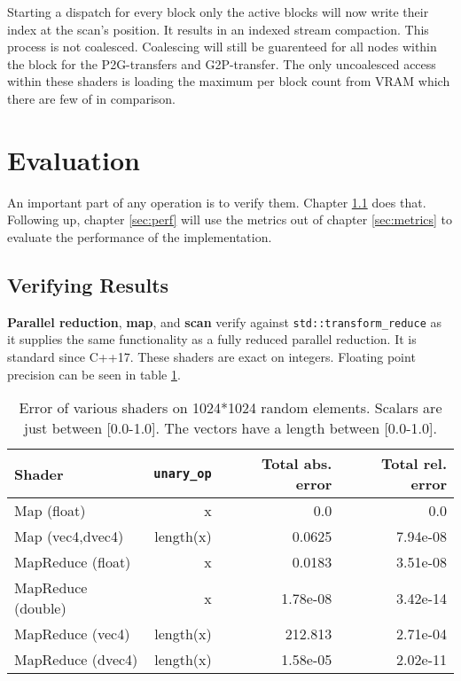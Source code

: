\documentclass[m,times]{cgMA}
\begin{document}
Starting a dispatch for every block only the active blocks will now write their index at the scan's position. It results in an indexed stream compaction. This process is not coalesced. Coalescing will still be guarenteed for all nodes within the block for the P2G-transfers and G2P-transfer. The only uncoalesced access within these shaders is loading the maximum per block count from VRAM which there are few of in comparison.

\clearpage
\section{Evaluation}\label{sec:eval}
An important part of any operation is to verify them. Chapter \ref{sec:verify} does that. Following up, chapter \ref{sec:perf} will use the metrics out of chapter \ref{sec:metrics} to evaluate the performance of the implementation.
\subsection{Verifying Results}\label{sec:verify}
\textbf{Parallel reduction}, \textbf{map}, and \textbf{scan} verify against \texttt{std::transform\_reduce} as it supplies the same functionality as a fully reduced parallel reduction. It is standard since C++17. These shaders are exact on integers. Floating point precision can be seen in table \ref{tab:parallel_red}.
\begin{table}[!b]
  \begin{tabular}{|l|r|r|r|}\hline
    Shader       & \texttt{unary\_op} & Total abs. error & Total rel. error \\\hline
    Map (float)   & x          & 0.0    & 0.0      \\\hline
    Map (vec4,dvec4)   & length(x)  &0.0625 & 7.94e-08 \\\hline\hline
    MapReduce (float)& x  &0.0183 & 3.51e-08 \\\hline
    MapReduce (double)& x  &1.78e-08 & 3.42e-14 \\\hline
    MapReduce (vec4)& length(x)  &212.813 & 2.71e-04 \\\hline
    MapReduce (dvec4)& length(x)  &1.58e-05 & 2.02e-11 \\\hline
  \end{tabular}
  \caption{Error of various shaders on 1024*1024 random elements. Scalars are just between [0.0-1.0]. The vectors have a length between [0.0-1.0].}
  \label{tab:parallel_red}
\end{table}
\end{document}
